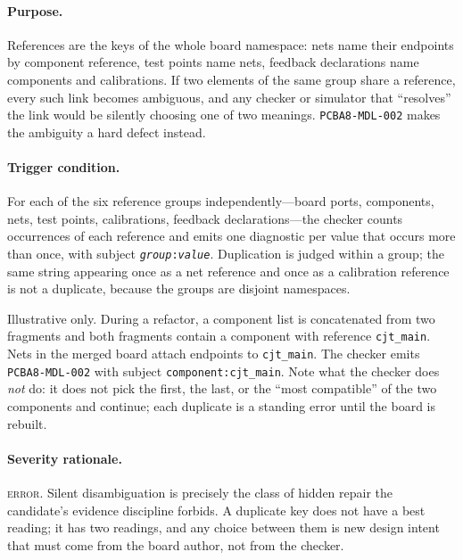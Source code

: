 \paragraph{Purpose.} References are the keys of the whole board namespace: nets name their endpoints by component reference, test points name nets, feedback declarations name components and calibrations. If two elements of the same group share a reference, every such link becomes ambiguous, and any checker or simulator that ``resolves'' the link would be silently choosing one of two meanings. \texttt{PCBA8-MDL-002} makes the ambiguity a hard defect instead.

\paragraph{Trigger condition.} For each of the six reference groups independently---board ports, components, nets, test points, calibrations, feedback declarations---the checker counts occurrences of each reference and emits one diagnostic per value that occurs more than once, with subject \texttt{\emph{group}:\emph{value}}. Duplication is judged within a group; the same string appearing once as a net reference and once as a calibration reference is not a duplicate, because the groups are disjoint namespaces.

\begin{example}\label{ch07:ex:mdl002}
Illustrative only. During a refactor, a component list is concatenated from two fragments and both fragments contain a component with reference \texttt{cjt\_main}. Nets in the merged board attach endpoints to \texttt{cjt\_main}. The checker emits \texttt{PCBA8-MDL-002} with subject \texttt{component:cjt\_main}. Note what the checker does \emph{not} do: it does not pick the first, the last, or the ``most compatible'' of the two components and continue; each duplicate is a standing error until the board is rebuilt.
\end{example}

\paragraph{Severity rationale.} \textsc{error}. Silent disambiguation is precisely the class of hidden repair the candidate's evidence discipline forbids. A duplicate key does not have a best reading; it has two readings, and any choice between them is new design intent that must come from the board author, not from the checker.

